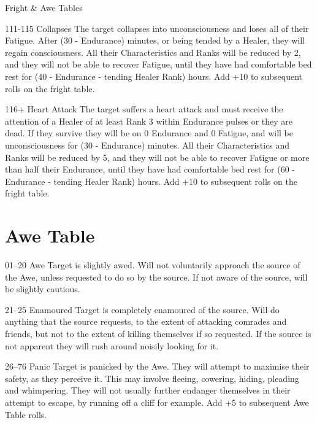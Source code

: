 \begin{Tables}{Fright \& Awe Tables}
\begin{multicols}{3}
\begin{Description}
\item[111-115] Collapses The target collapses into unconsciousness and
  loses all of their Fatigue. After (30 - Endurance) minutes, or being
  tended by a Healer, they will regain consciousness. All their
  Characteristics and Ranks will be reduced by 2, and they will not be
  able to recover Fatigue, until they have had comfortable bed rest
  for (40 - Endurance - tending Healer Rank) hours. Add +10 to
  subsequent rolls on the fright table.

\item[116+] Heart Attack The target suffers a heart attack and must
  receive the attention of a Healer of at least Rank 3 within
  Endurance pulses or they are dead. If they survive they will be on 0
  Endurance and 0 Fatigue, and will be unconsciousness for (30 -
  Endurance) minutes. All their Characteristics and Ranks will be
  reduced by 5, and they will not be able to recover Fatigue or more
  than half their Endurance, until they have had comfortable bed rest
  for (60 - Endurance - tending Healer Rank) hours. Add +10 to
  subsequent rolls on the fright table.

\end{Description} 

\end{multicols}


\section{Awe Table}

\begin{multicols}{3}

  \begin{Description}
\item[01--20] Awe Target is slightly awed. Will not voluntarily
  approach the source of the Awe, unless requested to do so by the
  source. If not aware of the source, will be slightly cautious.

\item[21--25] Enamoured Target is completely enamoured of the
  source. Will do anything that the source requests, to the extent of
  attacking comrades and friends, but not to the extent of killing
  themselves if so requested. If the source is not apparent they will
  rush around noisily looking for it.

\item[26--76] Panic Target is panicked by the Awe. They will attempt to
  maximise their safety, as they perceive it. This may involve
  fleeing, cowering, hiding, pleading and whimpering. They will not
  usually further endanger themselves in their attempt to escape, by
  running off a cliff for example. Add +5 to subsequent Awe Table
  rolls.


\end{Description}
\end{multicols}
\end{Tables}

